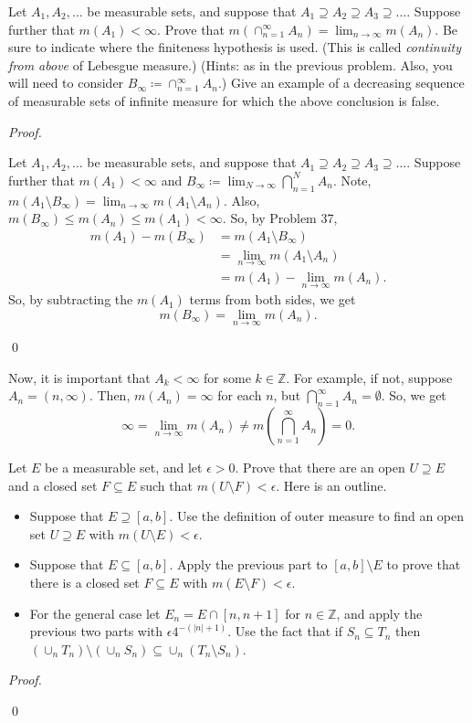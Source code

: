 \documentclass[12pt]{article}
\newenvironment{problem}[2][Problem]{\begin{trivlist}
\item[\hskip \labelsep {\bfseries #1}\hskip \labelsep {\bfseries
#2.}]}{\end{trivlist}}
\newenvironment{sol}
    {\emph{Proof.}
    }
    {
    \qed
    }
\begin{document}
\begin{problem}{38}
  Let $A_1,A_2,\dots$ be measurable sets, and suppose that $A_1 \supseteq A_2 \supseteq A_3 \supseteq \dots$. Suppose further that $m(A_1) < \infty$. Prove that $m(\cap_{n = 1}^{\infty}A_n) = \lim_{n \to \infty}m(A_n)$. Be sure to indicate where the finiteness hypothesis is used. (This is called \textit{continuity from above} of Lebesgue measure.) (Hints: as in the previous problem. Also, you will need to consider $B_{\infty} \coloneqq \cap_{n = 1}^{\infty}A_n$.) Give an example of a decreasing sequence of measurable sets of infinite measure for which the above conclusion is false. 
\end{problem}
\begin{sol}
  Let $A_1,A_2,\dots$ be measurable sets, and suppose that $A_1 \supseteq A_2 \supseteq A_3 \supseteq \dots$. Suppose further that $m(A_1) < \infty$ and $B_{\infty} \coloneqq \lim_{N \to \infty}\bigcap_{n = 1}^NA_n$. Note, $m(A_1 \setminus B_{\infty}) = \lim_{n \to \infty}m(A_1 \setminus A_n)$. Also, $m(B_{\infty}) \leq m(A_n) \leq m(A_1) < \infty$. So, by Problem 37, 
  \begin{align*}
    m(A_1) - m(B_{\infty}) &= m(A_1 \setminus B_{\infty}) \\
    &= \lim_{n \to \infty} m(A_1 \setminus A_n) \\
    &= m(A_1) - \lim_{n \to \infty} m(A_n).
  \end{align*}
  So, by subtracting the $m(A_1)$ terms from both sides, we get $$m(B_{\infty}) = \lim_{n \to \infty}m(A_n).$$
\end{sol}

Now, it is important that $A_k < \infty$ for some $k \in \mathbb{Z}$. For example, if not, suppose $A_n = (n,\infty)$. Then, $m(A_n) = \infty$ for each $n$, but $\bigcap_{n = 1}^{\infty}A_n = \emptyset$. So, we get $$\infty = \lim_{n \to \infty} m(A_n) \neq m(\bigcap_{n = 1}^{\infty}A_n) = 0.$$

\begin{problem}{39}
  Let $E$ be a measurable set, and let $\epsilon > 0$. Prove that there are an open $U \supseteq E$ and a closed set $F \subseteq E$ such that $m(U \setminus F) < \epsilon$. Here is an outline.

  \begin{itemize}
    \item[(a)] Suppose that $E \supseteq [a,b]$. Use the definition of outer measure to find an open set $U \supseteq E$ with $m(U \setminus E) < \epsilon$.
    \item[(b)] Suppose that $E \subseteq [a,b]$. Apply the previous part to $[a,b] \setminus E$ to prove that there is a closed set $F \subseteq E$ with $m(E \setminus F) < \epsilon$.
    \item[(c)] For the general case let $E_n = E \cap [n,n+1]$ for $n \in \mathbb{Z}$, and apply the previous two parts with $\epsilon4^{-(|n|+1)}$. Use the fact that if $S_n \subseteq T_n$ then $(\cup_nT_n) \setminus (\cup_nS_n) \subseteq \cup_n(T_n \setminus S_n)$.
  \end{itemize}
\end{problem}
\begin{sol}
  
\end{sol}
\end{document}
